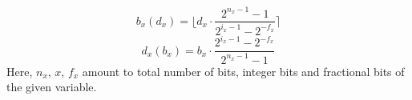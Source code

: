 \begin{equation}
b_{x}(d_{x})= \lfloor{d_{x}\cdot \frac{2^{n_{x}-1}-1}{2^{i_{x}-1}-2^{-f_{x}}}}\rceil
\label{equation:dtob}
\end{equation}
\begin{equation}
d_{x}(b_{x})= {b_{x}\cdot \frac{2^{i_{x}-1}-2^{-f_{x}}}{2^{n_{x}-1}-1}}
\label{equation:btod}
\end{equation}
Here, $n_{x}$, ${x}$, $f_{x}$ amount to total number of bits, integer bits and fractional bits of the given variable.
